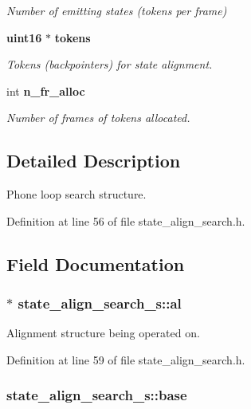 \begin{DoxyCompactItemize}
\begin{DoxyCompactList}\small\item\em \-Number of emitting states (tokens per frame) \end{DoxyCompactList}\item 
{\bf uint16} $\ast$ {\bf tokens}
\begin{DoxyCompactList}\small\item\em \-Tokens (backpointers) for state alignment. \end{DoxyCompactList}\item 
int {\bf n\-\_\-fr\-\_\-alloc}
\begin{DoxyCompactList}\small\item\em \-Number of frames of tokens allocated. \end{DoxyCompactList}\end{DoxyCompactItemize}


\subsection{\-Detailed \-Description}
\-Phone loop search structure. 

\-Definition at line 56 of file state\-\_\-align\-\_\-search.\-h.



\subsection{\-Field \-Documentation}
\subsubsection[{al}]{$\ast$ {\bf state\-\_\-align\-\_\-search\-\_\-s\-::al}}\label{structstate__align__search__s_a47b9b509c7416f8952ee452d8ce7dda6}


\-Alignment structure being operated on. 



\-Definition at line 59 of file state\-\_\-align\-\_\-search.\-h.

\subsubsection[{base}]{ {\bf state\-\_\-align\-\_\-search\-\_\-s\-::base}}\label{structstate__align__search__s_ab2a596d687e113c88a271d1397b8d9c5}


